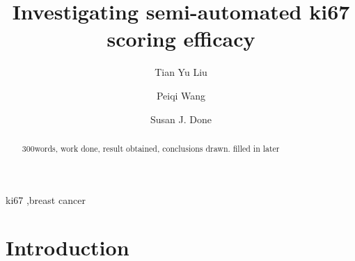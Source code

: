 \documentclass[final,5p,times,twocolumn]{elsarticle}
\begin{document}
\begin{frontmatter}

\title{Investigating semi-automated ki67 scoring efficacy}
\author[music]{Tian Yu Liu}
\author[molgen]{Peiqi Wang}
\author[cf]{Susan J. Done}
\address[music]{Faculty of Music, Univeristy of Toronto, ON, Canada}
\address[molgen]{Department of Molecular Genetics and Microbiology, University of Toronto, Canada}
\address[cf]{The Campbell Family Institute for Breast Cancer Research, Canada}

\begin{abstract}
300words, work done, result obtained, conclusions drawn. filled in later


%



\end{abstract}

\begin{keyword}
ki67 \sep breast cancer
\end{keyword}

\end{frontmatter}

\linenumbers

\section*{Introduction}
\end{document}
